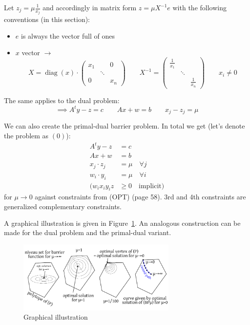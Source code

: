 \documentclass[a4paper]{article}
\numberwithin{lecref}{subsection}
\begin{document}
Let $z_j = \mu \frac1{x_j}$ and accordingly in matrix form $z = \mu X^{-1} e$ with the following conventions (in this section):
\begin{itemize}
	\item $e$ is always the vector full of ones
	\item $x$ vector $\to$
		\[ X = \operatorname{diag}(x) \cdot \begin{pmatrix} x_1 & & 0 \\ & \ddots & \\ 0 & & x_n \end{pmatrix} \qquad X^{-1} = \begin{pmatrix} \frac{1}{x_1} & & \\ & \ddots & \\ & & \frac{1}{x_n} \end{pmatrix} \qquad x_i \neq 0 \]
\end{itemize}
The same applies to the dual problem:
\[ \implies A^t y - z = c \qquad Ax + w = b \qquad x_j - z_j = \mu \]

We can also create the primal-dual barrier problem.
In total we get (let's denote the problem as $(0)$):
\begin{align*}
	A^t y - z &= c \\
	Ax + w &= b \\
	x_j \cdot z_j &= \mu \quad \forall j \\
	w_i \cdot y_i &= \mu \quad \forall i \\
	(w_i x_i y_i z &\geq 0 \quad \text{implicit})
\end{align*}
for $\mu \to 0$ against constraints from (OPT) (page 58).
3rd and 4th constraints are generalized complementary constraints.

A graphical illustration is given in Figure~\ref{img:graphical}.
An analogous construction can be made for the dual problem and the primal-dual variant.
\begin{figure}[!ht]
	\begin{center}
		\includegraphics[width=0.7\textwidth]{img/10_inner_point_method_graphical_illustration.pdf}
		\caption{Graphical illustration}
		\label{img:graphical}
	\end{center}
\end{figure}
\end{document}
